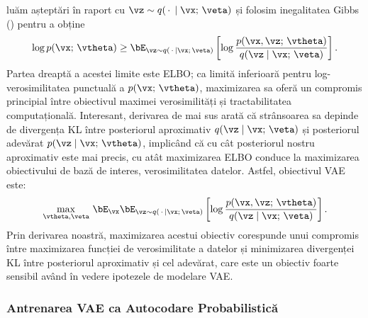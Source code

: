 \documentclass[../../book-main_ro.tex]{subfiles}
\begin{document}
luăm așteptări în raport cu $\vz \sim q(\,\cdot\, \mid
\vx;\, \veta)$ și
folosim inegalitatea Gibbs () pentru a obține
\begin{equation*}
\log p(\vx;\, \vtheta)
\geq
\bE_{\vz \sim q(\,\cdot\, \mid \vx ;\, \veta)} \left[
  \log \frac{p(\vx, \vz;\, \vtheta)}{q(\vz \mid \vx;\, \veta)}
\right].
\end{equation*}
Partea dreaptă a acestei limite este ELBO; ca limită inferioară pentru log-verosimilitatea
punctuală a $p(\vx;\, \vtheta)$, maximizarea sa oferă un compromis
principial
între obiectivul maximei verosimilități și tractabilitatea computațională.
Interesant, derivarea de mai sus arată că strânsoarea sa depinde de divergența
KL între posteriorul aproximativ $q(\vz \mid \vx;\, \veta)$ și
posteriorul adevărat $p(\vz \mid \vx;\, \vtheta)$, implicând că cu cât posteriorul nostru
aproximativ este mai precis, cu atât maximizarea ELBO conduce la
maximizarea obiectivului de bază de interes, verosimilitatea
datelor. Astfel, obiectivul VAE este:
\begin{equation}\label{eq:elbo-objective}
\max_{\vtheta, \veta}\,
\bE_{\vx}
\bE_{\vz \sim q(\,\cdot\, \mid \vx ;\, \veta)} \left[
  \log \frac{p(\vx, \vz;\, \vtheta)}{q(\vz \mid \vx;\, \veta)}
\right].
\end{equation}
Prin derivarea noastră, maximizarea acestui obiectiv corespunde unui compromis
între maximizarea funcției de verosimilitate a datelor și minimizarea divergenței
KL între posteriorul aproximativ și cel adevărat, care este un obiectiv foarte
sensibil având în vedere ipotezele de modelare VAE.

\subsubsection{Antrenarea VAE ca Autocodare Probabilistică}
\end{document}
